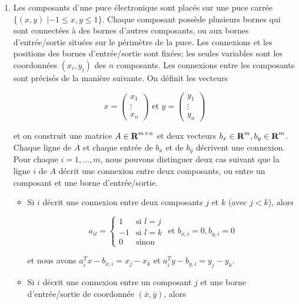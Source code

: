 \begin{enumerate}
  \item  Les composants d'une puce électronique sont placés sur
    une puce carrée $\{ (x, y) \; |  -1 \leq x, y \leq 1\}$.
    Chaque composant possède plusieurs bornes qui sont connectées à
    des bornes d'autres composants, ou aux bornes d'entrée/\-sortie situées sur le périmètre de la puce.  Les connexions et les
    positions des bornes d'entrée/sortie sont fixées; les seules variables sont les coordonnées   $(x_i, y_i)$ des $n$
    composants.  Les connexions entre les composants
    sont précisés de la manière suivante. On définit les vecteurs


    $$x=
    \left(
    \begin{array}{c}
      x_1\\
      \vdots\\
      x_n
    \end{array}
    \right)
    \mbox{ et }
    y=
    \left(
    \begin{array}{c}
      y_1\\
      \vdots\\
      y_n
    \end{array}
    \right)
    $$



    et on construit une matrice $A \in {\mbox{\bf R}}^{m \times n}$ et deux vecteurs $b_x \in {\mbox{\bf R}}^m, b_y \in {\mbox{\bf R}}^m$.
    Chaque ligne de
    $A$ et chaque entrée de $b_x$ et de $b_y$ décrivent une connexion. Pour chaque $i=1, \ldots, m$, nous pouvons distinguer deux cas
    suivant que la ligne $i$ de $A$ décrit une connexion entre deux composants, ou entre un composant et une borne d'entrée/sortie.
    \begin{itemize}
      \item Si $i$ décrit une connexion entre deux composants $j$ et $k$ (avec $j < k$), alors

        $$a_{il}=
        \left\{
          \begin{array}{rl}
            1 & \mbox{si } l=j\\
            -1 & \mbox{si } l=k\\
            0 & \mbox{sinon}
          \end{array}
        \right.
        \mbox{ et }
        b_{x, i}=0, b_{y,i}=0
        $$

        et nous avons  $a_i^Tx-b_{x,i}=x_j-x_k$ et $a_i^Ty-b_{y,i}=y_j-y_k.$

      \item Si $i$ décrit une connexion entre un composant $j$ et une borne d'entrée/sortie de coordonnée $(\bar x, \bar y)$, alors


\end{itemize}
\end{enumerate}
